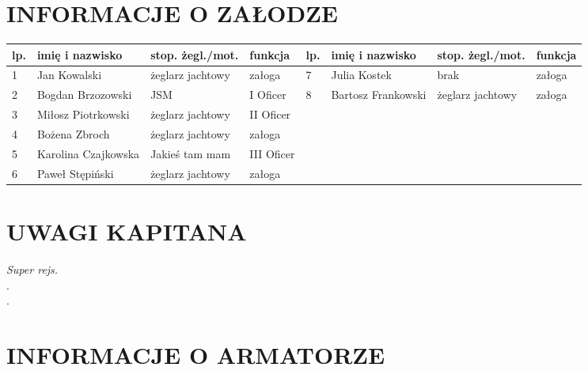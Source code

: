 \documentclass{article}
\begin{document}
\section*{INFORMACJE O ZAŁODZE}
    \begin{tabular}{|m{}|m{}|m{}|m{}||m{}|m{}|m{}|m{}|}
    \hline
    lp. & imię i nazwisko & stop. żegl./mot. & funkcja & lp. & imię i nazwisko &stop. żegl./mot. & funkcja\\
    \hline
    
1 & Jan Kowalski & żeglarz jachtowy & załoga &7 & Julia Kostek & brak & załoga\\
\hline
2 & Bogdan Brzozowski & JSM & I Oficer &8 & Bartosz Frankowski & żeglarz jachtowy & załoga\\
\hline
3 & Miłosz Piotrkowski & żeglarz jachtowy & II Oficer &&&&\\
\hline
4 & Bożena Zbroch & żeglarz jachtowy & załoga &&&&\\
\hline
5 & Karolina Czajkowska & Jakieś tam mam & III Oficer &&&&\\
\hline
6 & Paweł Stępiński & żeglarz jachtowy & załoga &&&&\\
\hline

    \end{tabular}
    
    
\section*{UWAGI KAPITANA}


\textit{Super rejs.}\dotfill \\
.\dotfill \\
.\dotfill \\
\section*{INFORMACJE O ARMATORZE}
\end{document}
